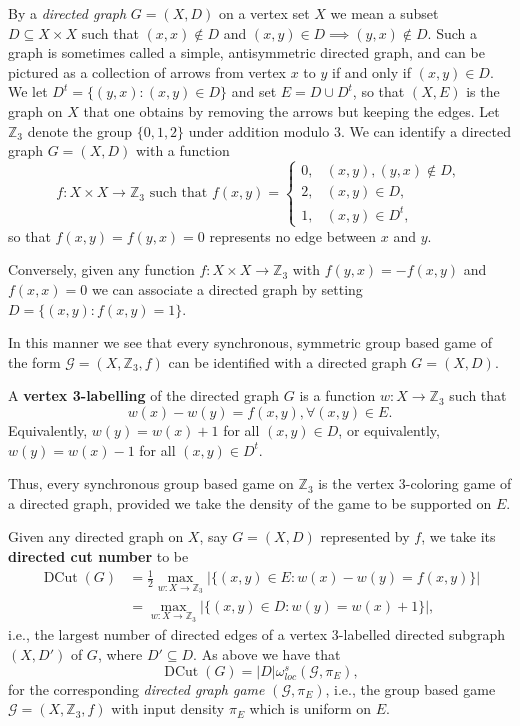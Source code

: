 \documentclass[11pt]{amsart}
\theoremstyle{definition}
\DeclareMathOperator{\DCut}{DCut}
\newcommand{\bb}[1]{\mathbb{#1}}
\newcommand{\cl}[1]{\mathcal{#1}}
\begin{document}
  By a {\it directed graph} $G=(X,D)$ on a vertex set $X$ we mean a subset $D \subseteq X \times X$ such that $(x,x) \notin D$ and $(x,y) \in D \implies (y,x) \notin D$. Such a graph is sometimes called a simple, antisymmetric directed graph, and can be pictured as a collection of arrows from vertex $x$ to $y$ if and only if $(x,y) \in D$. We let $D^t = \{ (y,x): (x,y) \in D \}$ and set $E= D \cup D^t$,  so that $(X, E)$ is the graph on $X$ that one obtains by removing the arrows but keeping the edges.
  Let $\bb Z_3$ denote the group $\{0,1,2\}$ under addition modulo
  $3$. We can identify a directed graph $G=(X, D)$ with a function
  \[ f: X \times X \to \bb Z_3 \text{ such that } f(x,y) = \begin{cases} 0, & (x,y),(y,x) \notin D,\\ 2, & (x,y) \in D, \\ 1, & (x,y) \in D^t, \end{cases} \]
  so that $f(x,y) = f(y,x) =0$ represents no edge between $x$ and $y$.

  Conversely, given any function $f:X \times X \to\bb Z_3$ with $f(y,x) = -f(x,y)$ and $f(x,x) =0$ we can associate a directed graph by setting $D = \{ (x,y):  f(x,y) = 1 \}$.

  In this manner we see that every synchronous, symmetric group based game of the form $\cl G= (X, \bb Z_3, f)$ can be identified with a directed graph $G=(X, D)$.

  A {\bf vertex 3-labelling} of the directed graph $G$ is a function $w:X \to \bb Z_3$ such that
  \[ w(x)- w(y) = f(x,y), \forall (x,y) \in E.\]
  Equivalently, $w(y)=w(x)+1$ for all $(x,y)\in D$, or equivalently, $w(y)=w(x)-1$ for all $(x,y)\in D^t$.

  Thus, every synchronous group based game on $\bb Z_3$ is the vertex 3-coloring game of a directed graph, provided we take the density of the game to be supported on $E$.

  Given any directed graph on $X$, say $G=(X, D)$ represented by $f$, we take its {\bf directed cut number} to be
  \begin{align*}
    \DCut(G) &=\frac12\max_{w:X \to \bb Z_3} |   \{ (x,y) \in E : w(x)- w(y) =f(x,y) \}|\\&=\max_{w:X \to \bb Z_3} |   \{ (x,y) \in D : w(y)=w(x)+1 \}|,
  \end{align*}
  i.e., the largest number of directed edges of a vertex $3$-labelled directed subgraph $(X,D')$ of $G$, where $D'\subseteq D$.
  As above we have that
  \[ \DCut(G) = |D|\omega^s_{loc}(\cl G,\pi_E),\]
  for the corresponding \emph{directed graph game} $(\cl G,\pi_E)$, i.e., the group based game $\cl G=(X,\bb Z_3,f)$ with input density $\pi_E$ which is uniform on $E$.
\end{document}

